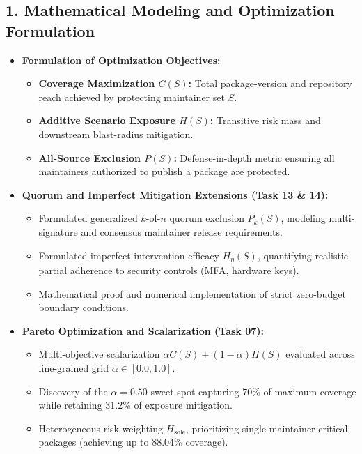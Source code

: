 \documentclass[11pt,a4paper]{article}
\begin{document}
\subsection{1. Mathematical Modeling and Optimization Formulation}
\begin{itemize}
  \item \textbf{Formulation of Optimization Objectives:}
  \begin{itemize}
    \item \textbf{Coverage Maximization $C(S)$:} Total package-version and repository reach achieved by protecting maintainer set $S$.
    \item \textbf{Additive Scenario Exposure $H(S)$:} Transitive risk mass and downstream blast-radius mitigation.
    \item \textbf{All-Source Exclusion $P(S)$:} Defense-in-depth metric ensuring all maintainers authorized to publish a package are protected.
  \end{itemize}
  \item \textbf{Quorum and Imperfect Mitigation Extensions (Task 13 \& 14):}
  \begin{itemize}
    \item Formulated generalized $k$-of-$n$ quorum exclusion $P_k(S)$, modeling multi-signature and consensus maintainer release requirements.
    \item Formulated imperfect intervention efficacy $H_\eta(S)$, quantifying realistic partial adherence to security controls (MFA, hardware keys).
    \item Mathematical proof and numerical implementation of strict zero-budget boundary conditions.
  \end{itemize}
  \item \textbf{Pareto Optimization and Scalarization (Task 07):}
  \begin{itemize}
    \item Multi-objective scalarization $\alpha C(S) + (1-\alpha) H(S)$ evaluated across fine-grained grid $\alpha \in [0.0, 1.0]$.
    \item Discovery of the $\alpha = 0.50$ sweet spot capturing 70\% of maximum coverage while retaining 31.2\% of exposure mitigation.
    \item Heterogeneous risk weighting $H_{\text{sole}}$, prioritizing single-maintainer critical packages (achieving up to 88.04\% coverage).
  \end{itemize}
\end{itemize}
\end{document}
